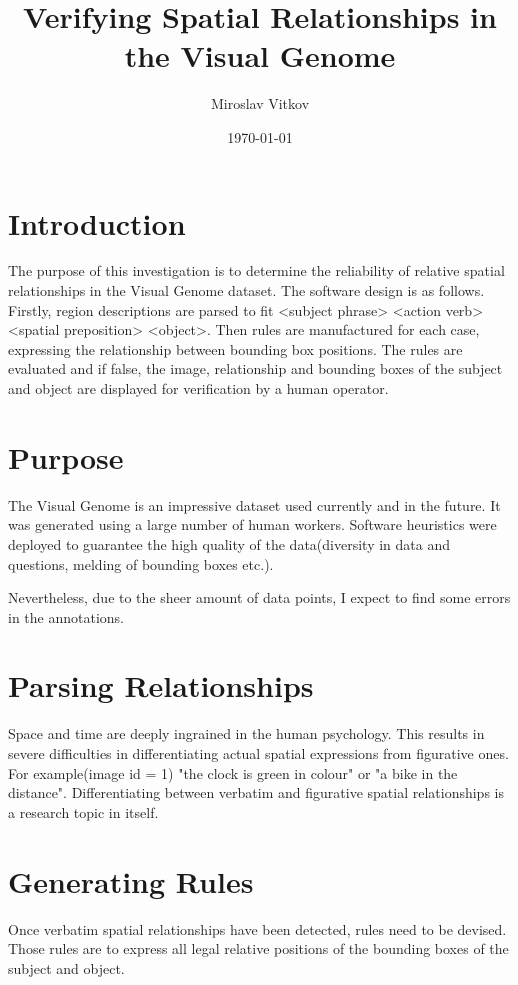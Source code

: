\documentclass{article}
\title{Verifying Spatial Relationships in the Visual Genome}
\author{Miroslav Vitkov}
\date{\today}
\begin{document}
\maketitle


\section{Introduction}
The purpose of this investigation is to determine the reliability of relative spatial relationships in the Visual Genome dataset.
The software design is as follows.
Firstly, region descriptions are parsed to fit <subject phrase> <action verb> <spatial preposition> <object>.
Then rules are manufactured for each case, expressing the relationship between bounding box positions.
The rules are evaluated and if false, the image, relationship and bounding boxes of the subject and object are displayed for verification by a human operator.


\section{Purpose}
The Visual Genome is an impressive dataset used currently and in the future.
It was generated using a large number of human workers.
Software heuristics were deployed to guarantee the high quality of the data(diversity in data and questions, melding of bounding boxes etc.).\cite{krishna}

Nevertheless, due to the sheer amount of data points, I expect to find some errors in the annotations.


\section{Parsing Relationships}
Space and time are deeply ingrained in the human psychology.\cite{zlatev}
This results in severe difficulties in differentiating actual spatial expressions from figurative ones.
For example(image id = 1) "the clock is green in colour" or "a bike in the distance".
Differentiating between verbatim and figurative spatial relationships is a research topic in itself.


\section{Generating Rules}
Once verbatim spatial relationships have been detected, rules need to be devised.
Those rules are to express all legal relative positions of the bounding boxes of the subject and object.
\end{document}
